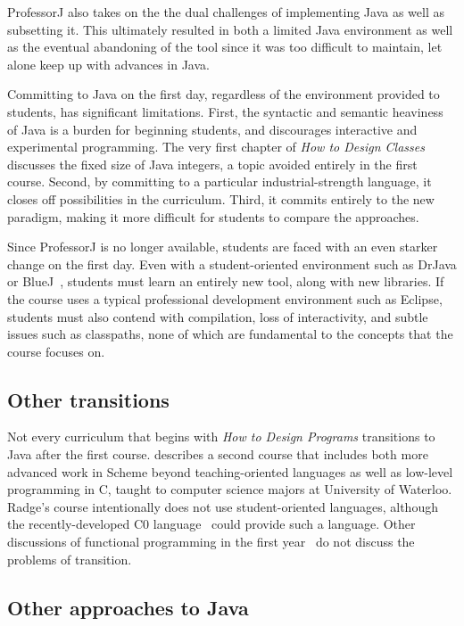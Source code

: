 \documentclass[submission,copyright]{eptcs}
\def\htdp{\emph{How to Design Programs}\xspace}
\def\htdc{\emph{How to Design Classes}\xspace}
\def\profj{{ProfessorJ}\xspace}
\begin{document}
\profj also takes on the the dual challenges of implementing Java as
well as subsetting it.  This ultimately resulted in both a limited
Java environment as well as the eventual abandoning of the tool since
it was too difficult to maintain, let alone keep up with advances in
Java.  

Committing to Java on the first day, regardless of the environment
provided to students, has significant limitations.  First, the
syntactic and semantic heaviness of Java is a burden for beginning
students, and discourages interactive and experimental programming.
The very first chapter of \htdc discusses the fixed size of Java
integers, a topic avoided entirely in the first course.  Second, by
committing to a particular industrial-strength language, it closes off
possibilities in the curriculum.  Third, it commits entirely to the
new paradigm, making it more difficult for students to compare the
approaches.

Since \profj is no longer available, students are faced with an even
starker change on the first day.  Even with a student-oriented
environment such as DrJava or BlueJ~\cite{dvanhorn:Allen2002DrJava,
  dvanhorn:Hsia2005Taming}, students must learn an entirely new tool,
along with new libraries.
If the course uses a typical professional development environment such
as Eclipse, students must also contend with compilation, loss of
interactivity, and subtle issues such as classpaths, none of which are
fundamental to the concepts that the course focuses on.


\subsection{Other transitions}

Not every curriculum that begins with \htdp transitions to Java after
the first course.  \citet{dvanhorn:Ragde2008Chilling} describes a
second course that includes both more advanced work in Scheme beyond
teaching-oriented languages as well as low-level programming in C,
taught to computer science majors at University of Waterloo.  Radge's
course intentionally does not use student-oriented languages, although
the recently-developed C0 language~\cite{local:c0} could provide such
a language. Other discussions of functional programming in the first
year~\cite{dvanhorn:Chakravarty2004Risks} do not discuss the problems
of transition.

\subsection{Other approaches to Java}
\end{document}
